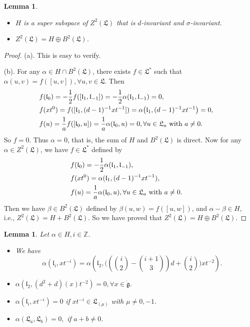 \documentclass[1p]{elsarticle}
\numberwithin{equation}{section}
\def\dg{\dot{\mathfrak{g}}}
\def\fL{\mathfrak{L}}
\def\bZ{\mathbb{Z}}
\def\fl{\mathfrak{l}}
\newtheorem{lemm}[theo]{Lemma}
\begin{document}
\begin{lemm}\label{lemm-5} \begin{itemize}
		\item [(a).] $H$ is a super subspace of $Z^2(\fL)$ that is $d$-invariant and $\sigma$-invariant.
		\item [(b).] $Z^2(\fL)=H\oplus B^2(\fL)$. \end{itemize}\end{lemm}

\begin{proof}  (a). This is easy to verify.
	
	(b). For any $\alpha\in H\cap B^2(\fL)$,  there exists $f\in \fL^*$ such that $\alpha(u,v)=f([u,v]),\forall u,v\in \fL$. Then $$\aligned &f(\fl_0)=-\frac 12f([\fl_1,\fl_{-1}])=-\frac 12\alpha(\fl_1,\fl_{-1})=0,\\
&	f(xt^0)=f([\fl_1,(d-1)^{-1}xt^{-1}])=\alpha\big(\fl_1,(d-1)^{-1}xt^{-1}\big)=0,\\
	&f(u)=\frac 1a f([\fl_0,u])=\frac 1a \alpha(\fl_0,u)=0,\forall u\in \fL_{a}\text{ with }a\ne 0.\endaligned$$
	So $f=0$. Thus $\alpha=0$, that is, the sum of $H$ and $B^2(\fL)$ is direct. Now for any $\alpha\in Z^2(\fL)$, we have $f\in \fL^*$ defined by
	$$\aligned &f(\fl_0)=-\frac 12\alpha(\fl_1,\fl_{-1}),\\ &f(xt^0)=\alpha(\fl_1,(d-1)^{-1}xt^{-1}),\\
	 &f(u)=\frac 1a \alpha(\fl_0,u),\forall u\in \fL_a\text{ with }a\ne 0.\endaligned $$
	Then we have $\beta\in B^2(\fL)$ defined by $\beta(u,w)=f([u,w])$, and $\alpha-\beta\in H$, i.e., $Z^2(\fL)=H+B^2(\fL)$. So we have proved that $Z^2(\fL)=H\oplus B^2(\fL)$.
\end{proof}




\begin{lemm} \label{lemm-6} Let  $\alpha\in H, i\in \bZ$.
	\begin{itemize}
		\item[(a).]
 We have \begin{equation}\label{d-g-4}\alpha(\fl_{i},xt^{-i})=\alpha\left(\fl_2,\Big((\binom i2-\binom {i+1}3)d+\binom i2\Big)xt^{-2}\right).\end{equation}
 	\item[(b).]
$ \alpha(\fl_2,(d^2+d)(x)t^{-2})=0,\forall x\in \dg.$
 	\item[(c).]   $\alpha(\fl_{i},xt^{-i})=0$ if $xt^{-i}\in \fL_{(\mu)}$ with $\mu\ne0, -1$.
 		\item[(d).] $\alpha(\fL_a,\fL_b)=0,$ if $ a+b\ne 0$.
 		\end{itemize}\end{lemm}
\end{document}
